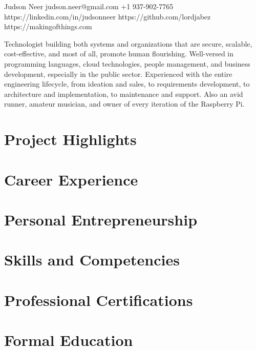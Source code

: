 \documentclass{article}
\begin{document}
\header
  {Judson Neer}
  {judson.neer@gmail.com}
  {+1 937-902-7765}
  {https://linkedin.com/in/judsonneer}
  {https://github.com/lordjabez}
  {https://makingofthings.com}

Technologist building both systems and organizations that are secure, scalable, cost-effective, and most of all, promote human flourishing. Well-versed in programming languages, cloud technologies, people management, and business development, especially in the public sector. Experienced with the entire engineering lifecycle, from ideation and sales, to requirements development, to architecture and implementation, to maintenance and support. Also an avid runner, amateur musician, and owner of every iteration of the Raspberry Pi.


\section{Project Highlights}




\pagebreak

\section{Career Experience}




\section{Personal Entrepreneurship}




\section{Skills and Competencies}




\vspace{5mm}

\section{Professional Certifications}




\vspace{5mm}

\section{Formal Education}




\credits
\end{document}
